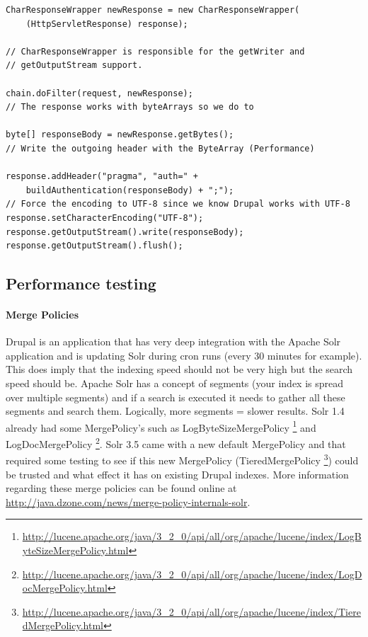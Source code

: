 \begin{verbatim}
CharResponseWrapper newResponse = new CharResponseWrapper(
    (HttpServletResponse) response);
    
// CharResponseWrapper is responsible for the getWriter and
// getOutputStream support.

chain.doFilter(request, newResponse);
// The response works with byteArrays so we do to

byte[] responseBody = newResponse.getBytes();
// Write the outgoing header with the ByteArray (Performance)

response.addHeader("pragma", "auth=" +
    buildAuthentication(responseBody) + ";");
// Force the encoding to UTF-8 since we know Drupal works with UTF-8
response.setCharacterEncoding("UTF-8");
response.getOutputStream().write(responseBody);
response.getOutputStream().flush();
\end{verbatim}
\caption{A snippet of the Acquia HMAC Filter for Solr 3.5. The buildAuthentication returns the value that is embedded in the HTTP headers so the client can verify the validity of the response}

\subsection{Performance testing}
\paragraph{Merge Policies} Drupal is an application that has very deep integration with the Apache Solr application and is updating Solr during cron runs (every 30 minutes for example). This does imply that the indexing speed should not be very high but the search speed should be. Apache Solr has a concept of segments (your index is spread over multiple segments) and if a search is executed it needs to gather all these segments and search them. Logically, more segments = slower results.
Solr 1.4 already had some MergePolicy's such as LogByteSizeMergePolicy \footnote{\url{http://lucene.apache.org/java/3_2_0/api/all/org/apache/lucene/index/LogByteSizeMergePolicy.html}} and LogDocMergePolicy \footnote{\url{http://lucene.apache.org/java/3_2_0/api/all/org/apache/lucene/index/LogDocMergePolicy.html}}. 
Solr 3.5 came with a new default MergePolicy and that required some testing to see if this new MergePolicy (TieredMergePolicy \footnote{\url{http://lucene.apache.org/java/3_2_0/api/all/org/apache/lucene/index/TieredMergePolicy.html}}) could be trusted and what effect it has on existing Drupal indexes.
More information regarding these merge policies can be found online at \url{http://java.dzone.com/news/merge-policy-internals-solr}.

